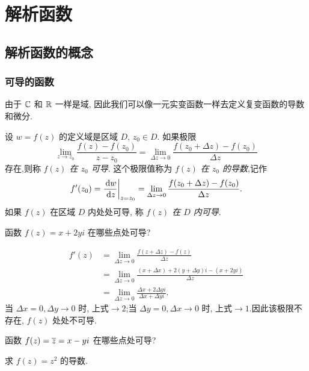 
\chapter{解析函数}
\section{解析函数的概念}

\subsection{可导的函数}

由于 ${\mathbb{C}}$ 和 ${\mathbb{R}}$ 一样是域, 因此我们可以像一元实变函数一样去定义复变函数的导数和微分.

\begin{definition}[导数]
	设 $w=f(z)$ 的定义域是区域 $D$, $z_0\in D$.
	如果极限
		\[\lim_{z\to z_0}\frac{f(z)-f(z_0)}{z-z_0}
		=\lim_{\Delta z\to 0}\frac{f(z_0+\Delta z)-f(z_0)}{\Delta z}\]
	存在,则称 \emph{$f(z)$ 在 $z_0$ 可导}.
  这个极限值称为 \emph{$f(z)$ 在 $z_0$ 的导数},记作
		\[f'(z_0)=\frac{\,\mathrm{d} w}{\,\mathrm{d} z}\bigg|_{z=z_0}
		=\lim_{\Delta z\to 0}\frac{f(z_0+\Delta z)-f(z_0)}{\Delta z}.\]
	如果 $f(z)$ 在区域 $D$ 内处处可导, 称 \emph{$f(z)$ 在 $D$ 内可导}.
\end{definition}

\begin{example}
	函数 $f(z)=x+2yi$ 在哪些点处可导?
\end{example}

\begin{solution}
	\begin{align*}
		f'(z)&=\lim_{\Delta z\to 0}\frac{f(z+\Delta z)-f(z)}{\Delta z}\\
		&{=\lim_{\Delta z\to 0}\frac{(x+\Delta x)+2(y+\Delta y)i-(x+2yi)}{\Delta z}}\\
		&{=\lim_{\Delta z\to 0}\frac{\Delta x+2\Delta y i}{\Delta x+\Delta yi}.}
	\end{align*}
	当 $\Delta x=0, \Delta y\to 0$ 时, 上式$\to2$;当 $\Delta y=0, \Delta x\to 0$ 时, 上式$\to1$.因此该极限不存在, $f(z)$ 处处不可导.
\end{solution}

\begin{exercise}
  函数 $f(z)=\overline z=x-yi$ 在哪些点处可导? 
\end{exercise}

\begin{example}
	求 $f(z)=z^2$ 的导数.
\end{example}

